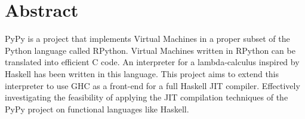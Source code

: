 
\section*{Abstract}

PyPy is a project that implements Virtual Machines in a proper subset of
the Python language called RPython. Virtual Machines written in RPython
can be translated into efficient C code. An interpreter for a lambda-calculus inspired by
Haskell has been written in this language.
This project aims to extend this interpreter to use GHC as a front-end for
a full Haskell JIT compiler. Effectively investigating the feasibility
of applying the JIT compilation techniques of the PyPy project on functional
languages like Haskell.


